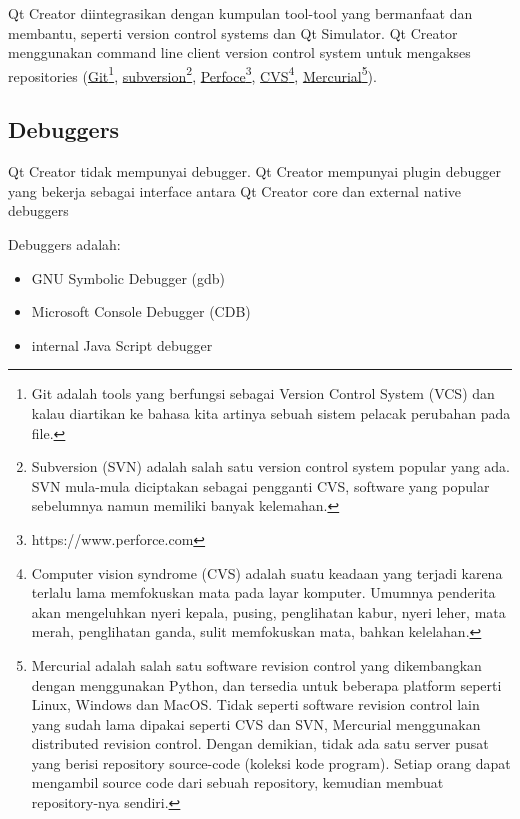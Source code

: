 Qt Creator diintegrasikan dengan kumpulan tool-tool yang bermanfaat dan
membantu, seperti version control systems dan Qt Simulator. Qt Creator
menggunakan command line client version control system untuk mengakses
repositories (\href{https://git-scm.com/}{Git}\footnote{Git adalah tools 
yang berfungsi sebagai Version Control System (VCS) dan kalau diartikan 
ke bahasa kita artinya sebuah sistem pelacak perubahan pada file.},
\href{https://subversion.apache.org/}{subversion}\footnote{Subversion
(SVN) adalah salah satu version control system popular yang ada. 
SVN mula-mula diciptakan sebagai pengganti CVS, software yang 
popular sebelumnya namun memiliki banyak kelemahan.},
\href{https://www.perforce.com}{Perfoce}\footnote{https://www.perforce.com},
\href{www.nongnu.org/cvs/}{CVS}\footnote{Computer vision syndrome (CVS) adalah suatu keadaan yang terjadi karena terlalu lama memfokuskan mata pada layar komputer. Umumnya penderita akan mengeluhkan nyeri kepala, pusing, penglihatan kabur, nyeri leher, mata merah, penglihatan ganda, sulit memfokuskan mata, bahkan kelelahan.},
\href{https://www.mercurial-scm.org}{Mercurial}\footnote{Mercurial adalah salah satu software revision control yang dikembangkan dengan menggunakan Python, dan tersedia untuk beberapa platform seperti Linux, Windows dan MacOS.  Tidak seperti software revision control lain yang sudah lama dipakai seperti CVS dan SVN, Mercurial menggunakan distributed revision control.  Dengan demikian, tidak ada satu server pusat yang berisi repository source-code (koleksi kode program).  Setiap orang dapat mengambil source code dari sebuah repository, kemudian membuat repository-nya sendiri.}).

\subsection{Debuggers}\label{debuggers}

Qt Creator tidak mempunyai debugger. Qt Creator mempunyai plugin
debugger yang bekerja sebagai interface antara Qt Creator core dan
external native debuggers

Debuggers adalah:

\begin{itemize}

\item
  GNU Symbolic Debugger (gdb)
\item
  Microsoft Console Debugger (CDB)
\item
  internal Java Script debugger
\end{itemize}

